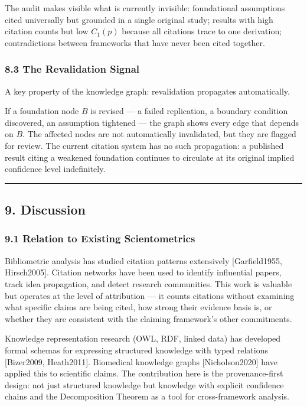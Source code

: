 \documentclass[
]{article}
\begin{document}
The audit makes visible what is currently invisible: foundational
assumptions cited universally but grounded in a single original study;
results with high citation counts but low \(C_1(p)\) because all
citations trace to one derivation; contradictions between frameworks
that have never been cited together.

\subsubsection{8.3 The Revalidation
Signal}\label{the-revalidation-signal}

A key property of the knowledge graph: revalidation propagates
automatically.

If a foundation node \(B\) is revised --- a failed replication, a
boundary condition discovered, an assumption tightened --- the graph
shows every edge that depends on \(B\). The affected nodes are not
automatically invalidated, but they are flagged for review. The current
citation system has no such propagation: a published result citing a
weakened foundation continues to circulate at its original implied
confidence level indefinitely.

\begin{center}\rule{0.5\linewidth}{0.5pt}\end{center}

\subsection{9. Discussion}\label{discussion}

\subsubsection{9.1 Relation to Existing
Scientometrics}\label{relation-to-existing-scientometrics}

Bibliometric analysis has studied citation patterns extensively
{[}Garfield1955, Hirsch2005{]}. Citation networks have been used to
identify influential papers, track idea propagation, and detect research
communities. This work is valuable but operates at the level of
attribution --- it counts citations without examining what specific
claims are being cited, how strong their evidence basis is, or whether
they are consistent with the claiming framework's other commitments.

Knowledge representation research (OWL, RDF, linked data) has developed
formal schemas for expressing structured knowledge with typed relations
{[}Bizer2009, Heath2011{]}. Biomedical knowledge graphs
{[}Nicholson2020{]} have applied this to scientific claims. The
contribution here is the provenance-first design: not just structured
knowledge but knowledge with explicit confidence chains and the
Decomposition Theorem as a tool for cross-framework analysis.
\end{document}
